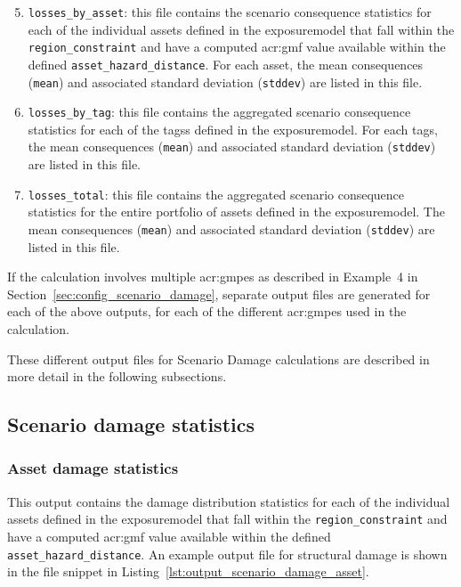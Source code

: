 \begin{enumerate}
\setcounter{enumi}{4}

  \item \Verb+losses_by_asset+: this file contains the scenario consequence
    statistics for each of the individual \glspl{asset} defined in the
    \gls{exposuremodel} that fall within the \Verb+region_constraint+ and have
    a computed \gls{acr:gmf} value available within the defined
    \Verb+asset_hazard_distance+. For each \gls{asset}, the mean consequences
    (\Verb+mean+) and associated standard deviation (\Verb+stddev+) are listed
    in this file.

  \item \Verb+losses_by_tag+: this file contains the aggregated scenario
    consequence statistics for each of the \glspl{tags} defined in the
    \gls{exposuremodel}. For each \gls{tags}, the mean consequences
    (\Verb+mean+) and associated standard deviation (\Verb+stddev+) are listed
    in this file.

  \item \Verb+losses_total+: this file contains the aggregated scenario
    consequence statistics for the entire portfolio of \glspl{asset} defined
    in the \gls{exposuremodel}. The mean consequences (\Verb+mean+) and 
    associated standard deviation (\Verb+stddev+) are listed in this file.

\end{enumerate}

If the calculation involves multiple \glspl{acr:gmpe} as described in
Example~4 in Section~\ref{sec:config_scenario_damage}, separate output files
are generated for each of the above outputs, for each of the different
\glspl{acr:gmpe} used in the calculation.

These different output files for Scenario Damage calculations are described in
more detail in the following subsections.


\subsection{Scenario damage statistics}
\label{subsec:scenario_damage_statistics}

\subsubsection{Asset damage statistics}
\label{subsubsec:scenario_asset_damage_statistics}

This output contains the damage distribution statistics for each of the
individual \glspl{asset} defined in the \gls{exposuremodel} that fall within
the \Verb+region_constraint+ and have a computed \gls{acr:gmf} value available
within the defined \Verb+asset_hazard_distance+. An example output file for
structural damage is shown in the file snippet in Listing~\ref{lst:output_scenario_damage_asset}.

